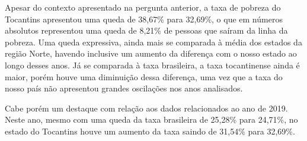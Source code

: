 \par Apesar do contexto apresentado na pergunta anterior, a taxa de pobreza do Tocantins apresentou uma queda de 38,67\% para 32,69\%, o que em números absolutos representou uma queda de 8,21\% de pessoas que saíram da linha da pobreza. Uma queda expressiva, ainda mais se comparada à média dos estados da região Norte, havendo inclusive um aumento da diferença com o nosso estado ao longo desses anos. Já se comparada à taxa brasileira, a taxa tocantinense ainda é maior, porém houve uma diminuição dessa diferença, uma vez que a taxa do nosso país não apresentou grandes oscilações nos anos analisados.
\par Cabe porém um destaque com relação aos dados relacionados ao ano de 2019. Neste ano, mesmo com uma queda da taxa brasileira de 25,28\% para 24,71\%, no estado do Tocantins houve um aumento da taxa saindo de 31,54\% para 32,69\%.

